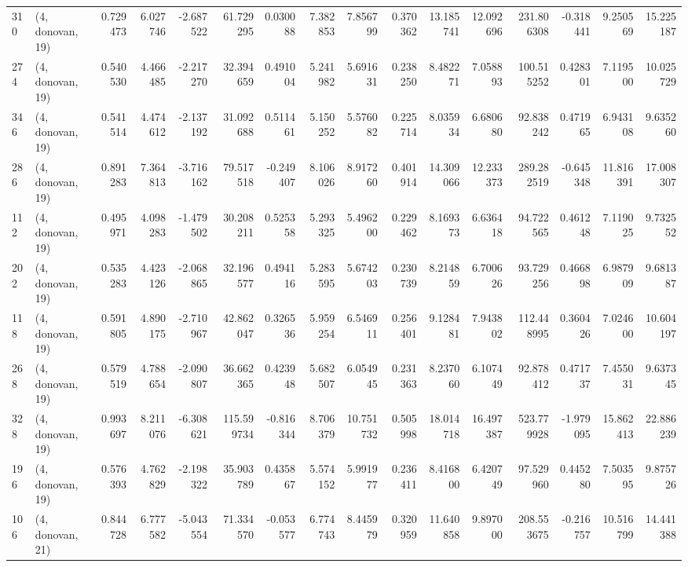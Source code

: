 \begin{tabular}{llrrrrrrrrrrrrrr}
310 &  (4, donovan, 19) &   0.729473 &   6.027746 &  -2.687522 &    61.729295 &   0.030088 &   7.382853 &   7.856799 &  0.370362 &  13.185741 &  12.092696 &    231.806308 &   -0.318441 &    9.250569 &   15.225187 \\
274 &  (4, donovan, 19) &   0.540530 &   4.466485 &  -2.217270 &    32.394659 &   0.491004 &   5.241982 &   5.691631 &  0.238250 &   8.482271 &   7.058893 &    100.515252 &    0.428301 &    7.119500 &   10.025729 \\
346 &  (4, donovan, 19) &   0.541514 &   4.474612 &  -2.137192 &    31.092688 &   0.511461 &   5.150252 &   5.576082 &  0.225714 &   8.035934 &   6.680680 &     92.838242 &    0.471965 &    6.943108 &    9.635260 \\
286 &  (4, donovan, 19) &   0.891283 &   7.364813 &  -3.716162 &    79.517518 &  -0.249407 &   8.106026 &   8.917260 &  0.401914 &  14.309066 &  12.233373 &    289.282519 &   -0.645348 &   11.816391 &   17.008307 \\
112 &  (4, donovan, 19) &   0.495971 &   4.098283 &  -1.479502 &    30.208211 &   0.525358 &   5.293325 &   5.496200 &  0.229462 &   8.169373 &   6.636418 &     94.722565 &    0.461248 &    7.119025 &    9.732552 \\
202 &  (4, donovan, 19) &   0.535283 &   4.423126 &  -2.068865 &    32.196577 &   0.494116 &   5.283595 &   5.674203 &  0.230739 &   8.214859 &   6.700626 &     93.729256 &    0.466898 &    6.987909 &    9.681387 \\
118 &  (4, donovan, 19) &   0.591805 &   4.890175 &  -2.710967 &    42.862047 &   0.326536 &   5.959254 &   6.546911 &  0.256401 &   9.128481 &   7.943802 &    112.448995 &    0.360426 &    7.024600 &   10.604197 \\
268 &  (4, donovan, 19) &   0.579519 &   4.788654 &  -2.090807 &    36.662365 &   0.423948 &   5.682507 &   6.054945 &  0.231363 &   8.237060 &   6.107449 &     92.878412 &    0.471737 &    7.455031 &    9.637345 \\
328 &  (4, donovan, 19) &   0.993697 &   8.211076 &  -6.308621 &   115.599734 &  -0.816344 &   8.706379 &  10.751732 &  0.505998 &  18.014718 &  16.497387 &    523.779928 &   -1.979095 &   15.862413 &   22.886239 \\
196 &  (4, donovan, 19) &   0.576393 &   4.762829 &  -2.198322 &    35.903789 &   0.435867 &   5.574152 &   5.991977 &  0.236411 &   8.416800 &   6.420749 &     97.529960 &    0.445280 &    7.503595 &    9.875726 \\
106 &  (4, donovan, 21) &   0.844728 &   6.777582 &  -5.043554 &    71.334570 &  -0.053577 &   6.774743 &   8.445979 &  0.320959 &  11.640858 &   9.897000 &    208.553675 &   -0.216757 &   10.516799 &   14.441388 \\

\end{tabular}
